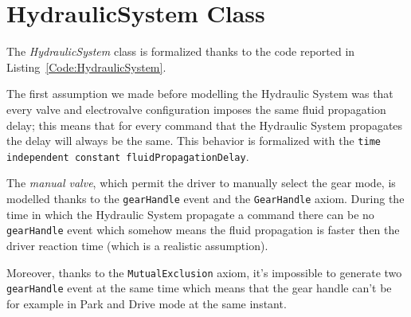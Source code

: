\section{HydraulicSystem Class}
\label{Section:HydraulicSystem}
The \emph{HydraulicSystem} class is formalized thanks to the code reported in Listing~\ref{Code:HydraulicSystem}.

The first assumption we made before modelling the Hydraulic System was that every valve and electrovalve configuration imposes the same fluid propagation delay; this means that for every command that the Hydraulic System propagates the delay will always be the same. This behavior is formalized with the \texttt{time independent constant fluidPropagationDelay}.

The \emph{manual valve}, which permit the driver to manually select the gear mode, is modelled thanks to the \texttt{gearHandle} event and the \texttt{GearHandle} axiom. During the time in which the Hydraulic System propagate a command there can be no \texttt{gearHandle} event which somehow means the fluid propagation is faster then the driver reaction time (which is a realistic assumption).

Moreover, thanks to the \texttt{MutualExclusion} axiom, it's impossible to generate two \texttt{gearHandle} event at the same time which means that the gear handle can't be for example in Park and Drive mode at the same instant.


